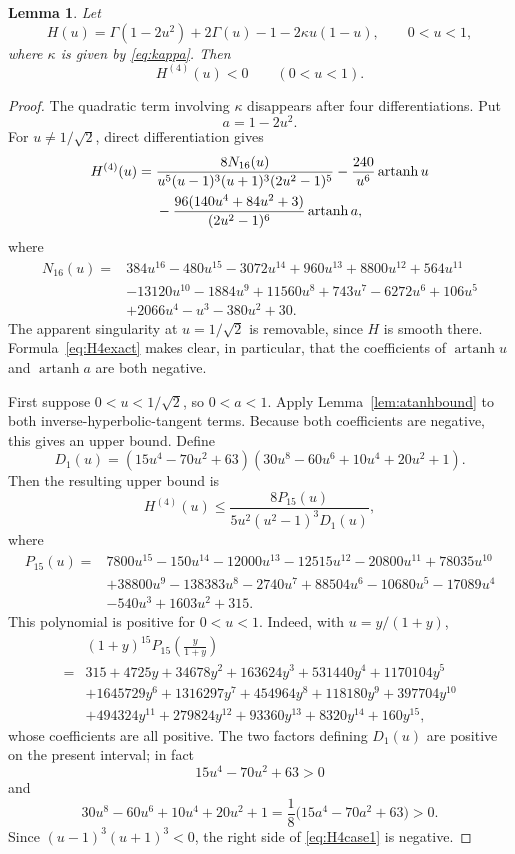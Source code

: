 \documentclass[10pt,a4paper]{amsart}
\newtheorem{lemma}{Lemma}
\newcommand{\artanh}{\operatorname{artanh}}
\begin{document}
\begin{lemma}
\label{lem:H4}
Let
\begin{equation}
\label{eq:Hdef}
H(u)
=
\Gamma(1-2u^2)+2\Gamma(u)-1-2\kappa u(1-u),
\qquad 0<u<1,
\end{equation}
where $\kappa$ is given by \eqref{eq:kappa}.  Then
\begin{equation}
\label{eq:H4neg}
H^{(4)}(u)<0
\qquad(0<u<1).
\end{equation}
\end{lemma}

\begin{proof}
The quadratic term involving $\kappa$ disappears after four differentiations.  Put
\[
a=1-2u^2.
\]
For $u\ne1/\sqrt2$, direct differentiation gives
\begin{align}
H^{(4)}(u)={}&
\frac{8N_{16}(u)}
{u^5(u-1)^3(u+1)^3(2u^2-1)^5}
-\frac{240}{u^6}\artanh u \notag\\
&-\frac{96(140u^4+84u^2+3)}{(2u^2-1)^6}\artanh a,
\label{eq:H4exact}
\end{align}
where
\begin{align*}
N_{16}(u)={}&384u^{16}-480u^{15}-3072u^{14}+960u^{13}+8800u^{12}
+564u^{11}\\
&-13120u^{10}-1884u^9+11560u^8+743u^7-6272u^6+106u^5\\
&+2066u^4-u^3-380u^2+30.
\end{align*}
The apparent singularity at $u=1/\sqrt2$ is removable, since $H$ is smooth there.  Formula~\eqref{eq:H4exact} makes clear, in particular, that the coefficients of $\artanh u$ and $\artanh a$ are both negative.

First suppose $0<u<1/\sqrt2$, so $0<a<1$.  Apply Lemma~\ref{lem:atanhbound} to both inverse-hyperbolic-tangent terms.  Because both coefficients are negative, this gives an upper bound.
Define
\[
D_1(u)=(15u^4-70u^2+63)
(30u^8-60u^6+10u^4+20u^2+1).
\]
Then the resulting upper bound is
\begin{equation}
\label{eq:H4case1}
H^{(4)}(u)
\le
\frac{8P_{15}(u)}{5u^2(u^2-1)^3D_1(u)},
\end{equation}
where
\begin{align*}
P_{15}(u)={}&
7800u^{15}-150u^{14}-12000u^{13}-12515u^{12}
-20800u^{11}+78035u^{10}\\
&+38800u^9-138383u^8-2740u^7+88504u^6
-10680u^5-17089u^4\\
&-540u^3+1603u^2+315.
\end{align*}
This polynomial is positive for $0<u<1$.  Indeed, with $u=y/(1+y)$,
\begin{align*}
&(1+y)^{15}P_{15}\left(\frac{y}{1+y}\right)\\
={}&315+4725y+34678y^2+163624y^3+531440y^4
+1170104y^5\\
&+1645729y^6+1316297y^7+454964y^8+118180y^9
+397704y^{10}\\
&+494324y^{11}+279824y^{12}+93360y^{13}+8320y^{14}+160y^{15},
\end{align*}
whose coefficients are all positive.  The two factors defining $D_1(u)$ are positive on the present interval; in fact
\[
15u^4-70u^2+63>0
\]
and
\[
30u^8-60u^6+10u^4+20u^2+1
=\frac18\bigl(15a^4-70a^2+63\bigr)>0.
\]
Since $(u-1)^3(u+1)^3<0$, the right side of \eqref{eq:H4case1} is negative.


\end{proof}
\end{document}
